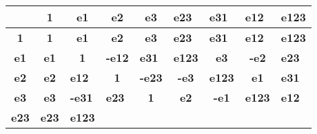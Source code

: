 \documentclass[a4paper]{book}
\numberwithin{equation}{chapter}
\begin{document}
\begin{table}[h]
\centering
\begin{tabular}{|c|c|c|c|c|l|l|l|l|}
\hline
\cellcolor[HTML]{FAFF9F}\textbf{} &
  \cellcolor[HTML]{F4F0AB}\textbf{1} &
  \cellcolor[HTML]{EDE2B7}\textbf{e1} &
  \cellcolor[HTML]{E7D3C3}\textbf{e2} &
  \cellcolor[HTML]{E1C4CF}\textbf{e3} &
  \cellcolor[HTML]{DBB6DB}\textbf{e23} &
  \cellcolor[HTML]{D5A7E7}\textbf{e31} &
  \cellcolor[HTML]{CE99F3}\textbf{e12} &
  \cellcolor[HTML]{998AFF}\textbf{e123} \\ \hline
\cellcolor[HTML]{F4F0AB}\textbf{1} &
  \cellcolor[HTML]{F4F0AB}\textbf{1} &
  \cellcolor[HTML]{EDE2B7}\textbf{e1} &
  \cellcolor[HTML]{E7D3C3}\textbf{e2} &
  \cellcolor[HTML]{E1C4CF}\textbf{e3} &
  \cellcolor[HTML]{DBB6DB}\textbf{e23} &
  \cellcolor[HTML]{D5A7E7}\textbf{e31} &
  \cellcolor[HTML]{CE99F3}\textbf{e12} &
  \cellcolor[HTML]{998AFF}\textbf{e123} \\ \hline
\cellcolor[HTML]{EDE2B7}\textbf{e1} &
  \cellcolor[HTML]{EDE2B7}\textbf{e1} &
  \cellcolor[HTML]{F4F0AB}\textbf{1} &
  \multicolumn{1}{l|}{\cellcolor[HTML]{CE99F3}\textbf{-e12}} &
  \multicolumn{1}{l|}{\cellcolor[HTML]{D5A7E7}\textbf{e31}} &
  \cellcolor[HTML]{998AFF}\textbf{e123} &
  \multicolumn{1}{c|}{\cellcolor[HTML]{E1C4CF}\textbf{e3}} &
  \multicolumn{1}{c|}{\cellcolor[HTML]{E7D3C3}\textbf{-e2}} &
  \cellcolor[HTML]{DBB6DB}\textbf{e23} \\ \hline
\cellcolor[HTML]{E7D3C3}\textbf{e2} &
  \cellcolor[HTML]{E7D3C3}\textbf{e2} &
  \multicolumn{1}{l|}{\cellcolor[HTML]{CE99F3}\textbf{e12}} &
  \cellcolor[HTML]{F4F0AB}\textbf{1} &
  \multicolumn{1}{l|}{\cellcolor[HTML]{DBB6DB}\textbf{-e23}} &
  \multicolumn{1}{c|}{\cellcolor[HTML]{E1C4CF}\textbf{-e3}} &
  \cellcolor[HTML]{998AFF}\textbf{e123} &
  \multicolumn{1}{c|}{\cellcolor[HTML]{EDE2B7}\textbf{e1}} &
  \cellcolor[HTML]{D5A7E7}\textbf{e31} \\ \hline
\cellcolor[HTML]{E1C4CF}\textbf{e3} &
  \cellcolor[HTML]{E1C4CF}\textbf{e3} &
  \multicolumn{1}{l|}{\cellcolor[HTML]{D5A7E7}\textbf{-e31}} &
  \multicolumn{1}{l|}{\cellcolor[HTML]{DBB6DB}\textbf{e23}} &
  \cellcolor[HTML]{F4F0AB}\textbf{1} &
  \multicolumn{1}{c|}{\cellcolor[HTML]{E7D3C3}\textbf{e2}} &
  \multicolumn{1}{c|}{\cellcolor[HTML]{EDE2B7}\textbf{-e1}} &
  \cellcolor[HTML]{998AFF}\textbf{e123} &
  \cellcolor[HTML]{CE99F3}\textbf{e12} \\ \hline
\multicolumn{1}{|l|}{\cellcolor[HTML]{DBB6DB}\textbf{e23}} &
  \multicolumn{1}{l|}{\cellcolor[HTML]{DBB6DB}\textbf{e23}} &
  \multicolumn{1}{l|}{\cellcolor[HTML]{998AFF}\textbf{e123}} &

\end{tabular}
\end{table}
\end{document}
